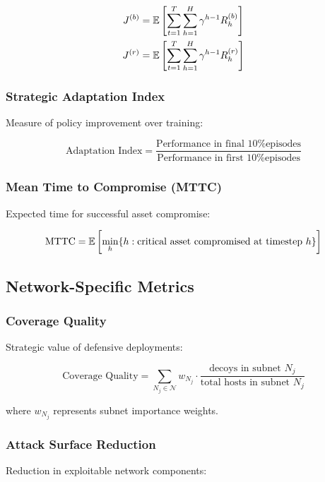 \documentclass[12pt,twoside]{article}
\theoremstyle{definition}
\theoremstyle{plain}
\begin{document}
\begin{align}
J^{(b)} &= \mathbb{E}\left[\sum_{t=1}^{T} \sum_{h=1}^{H} \gamma^{h-1} R_h^{(b)}\right] \\
J^{(r)} &= \mathbb{E}\left[\sum_{t=1}^{T} \sum_{h=1}^{H} \gamma^{h-1} R_h^{(r)}\right]
\end{align}

\subsubsection{Strategic Adaptation Index}
Measure of policy improvement over training:

\begin{equation}
\text{Adaptation Index} = \frac{\text{Performance in final 10\% episodes}}{\text{Performance in first 10\% episodes}}
\end{equation}

\subsubsection{Mean Time to Compromise (MTTC)}
Expected time for successful asset compromise:

\begin{equation}
\text{MTTC} = \mathbb{E}\left[\min_h \{h : \text{critical asset compromised at timestep } h\}\right]
\end{equation}

\subsection{Network-Specific Metrics}

\subsubsection{Coverage Quality}
Strategic value of defensive deployments:

\begin{equation}
\text{Coverage Quality} = \sum_{N_j \in \mathcal{N}} w_{N_j} \cdot \frac{\text{decoys in subnet } N_j}{\text{total hosts in subnet } N_j}
\end{equation}

where $w_{N_j}$ represents subnet importance weights.

\subsubsection{Attack Surface Reduction}
Reduction in exploitable network components:
\end{document}

